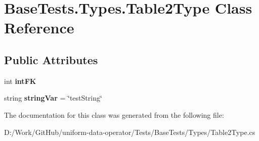 \hypertarget{class_base_tests_1_1_types_1_1_table2_type}{}\section{Base\+Tests.\+Types.\+Table2\+Type Class Reference}
\label{class_base_tests_1_1_types_1_1_table2_type}
\subsection*{Public Attributes}
\begin{DoxyCompactItemize}
\item 
\mbox{\label{class_base_tests_1_1_types_1_1_table2_type_a2de891713a0dc1d7e774bb0bdad1ef3c}} 
int {\bfseries int\+FK}
\item 
\mbox{\label{class_base_tests_1_1_types_1_1_table2_type_adb1d8b5e52be3103e77e032916aa6d88}} 
string {\bfseries string\+Var} = \char`\"{}test\+String\char`\"{}
\end{DoxyCompactItemize}


The documentation for this class was generated from the following file\+:\begin{DoxyCompactItemize}
\item 
D\+:/\+Work/\+Git\+Hub/uniform-\/data-\/operator/\+Tests/\+Base\+Tests/\+Types/Table2\+Type.\+cs\end{DoxyCompactItemize}
